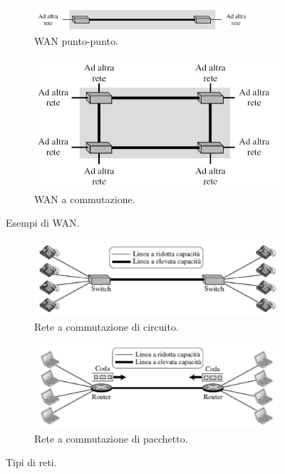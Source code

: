\documentclass[11pt, italian, openany]{book}
\begin{document}
\begin{sloppypar}
\begin{figure}[h!]
	\begin{subfigure}[t]{0.49 \linewidth} \centering
		\includegraphics[width=80mm,height=10mm]{images/wan-puntopunto.png}
		\caption{WAN punto-punto.}
	\end{subfigure}
	\begin{subfigure}[t]{0.49 \linewidth} \centering
		\includegraphics[scale=0.35]{images/wan-commutazione.png}
		\caption{WAN a commutazione.}
	\end{subfigure}
	\caption{Esempi di WAN.}
	\label{fig:WAN}
\end{figure}

\begin{figure}[h!]
	\begin{subfigure}[t]{0.49 \linewidth} \centering
		\includegraphics[scale=0.25]{images/commutazione-circuito.png}
		\caption{Rete a commutazione di circuito.}
	\end{subfigure}
	\begin{subfigure}[t]{0.49 \linewidth} \centering
		\includegraphics[scale=0.25]{images/commutazione-pacchetto.png}
		\caption{Rete a commutazione di pacchetto.}
	\end{subfigure}
	\caption{Tipi di reti.}
	\label{fig:tipi-reti}
\end{figure}


\end{sloppypar}
\end{document}
